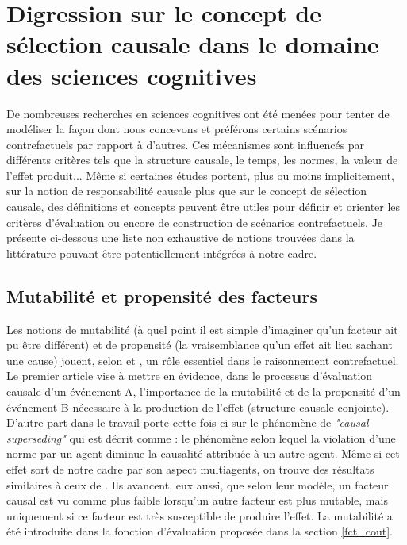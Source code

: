 \section{Digression sur le concept de sélection causale dans le domaine des sciences cognitives}\label{scienceco}

De nombreuses recherches en sciences cognitives ont été menées pour tenter de modéliser la façon dont nous concevons et préférons certains scénarios contrefactuels par rapport à d'autres. Ces mécanismes sont influencés par différents critères tels que la structure causale, le temps, les normes, la valeur de l'effet produit... Même si certaines études portent, plus ou moins implicitement, sur la notion de responsabilité causale plus que sur le concept de sélection causale, des définitions et concepts peuvent être utiles pour définir et orienter les critères d'évaluation ou encore de construction de scénarios contrefactuels. Je présente ci-dessous une liste non exhaustive de notions trouvées dans la littérature pouvant être potentiellement intégrées à notre cadre.

\subsection{Mutabilité et propensité des facteurs}\label{mut_prop}
Les notions de mutabilité (à quel point il est simple d'imaginer qu'un facteur ait pu être différent) et de propensité (la vraisemblance qu'un effet ait lieu sachant une cause) jouent, selon \textcite{kominsky_causal_2015} et \textcite{mcgill_mutability_2000}, un rôle essentiel dans le raisonnement contrefactuel. Le premier article vise à mettre en évidence, dans le processus d'évaluation causale d'un événement A, l'importance de la mutabilité et de la propensité d'un événement B nécessaire à la production de l'effet (structure causale conjointe). D'autre part dans \parencite{kominsky_causal_2015} le travail porte cette fois-ci sur le phénomène de \textit{"causal superseding"} qui est décrit comme : le phénomène selon lequel la violation d'une norme par un agent diminue la causalité attribuée à un autre agent. Même si cet effet sort de notre cadre par son aspect multiagents, on trouve des résultats similaires à ceux de \textcite{mcgill_mutability_2000}. Ils avancent, eux aussi, que selon leur modèle, un facteur causal est vu comme plus faible lorsqu'un autre facteur est plus mutable, mais uniquement si ce facteur est très susceptible de produire l'effet. La mutabilité a été introduite dans la fonction d'évaluation proposée dans la section \ref{fct_cout}.

